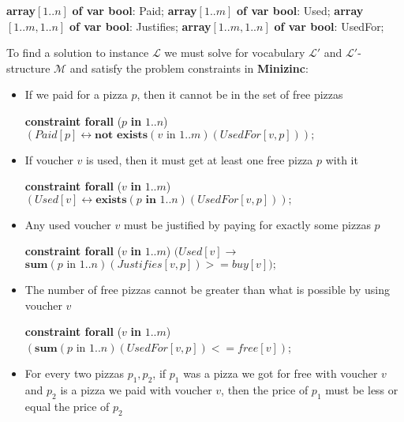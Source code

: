\documentclass[conference]{IEEEtran}
\newcommand\tab[1][0.3cm]{\hspace*{#1}}
\begin{document}
\begin{algorithmic}
\State \textbf{array}$[1..n]$ \textbf{of var bool}: Paid;
\State \textbf{array}$[1..m]$ \textbf{of var bool}: Used;
\State \textbf{array}$[1..m, 1..n]$ \textbf{of var bool}: Justifies;
\State \textbf{array}$[1..m, 1..n]$ \textbf{of var bool}: UsedFor;
\\
\end{algorithmic}
\tab To find a solution to instance $\mathcal{L}$ we must solve for vocabulary $\mathcal{L'}$ and $\mathcal{L'}$-structure $\mathcal{M}$ and satisfy the problem constraints in \textbf{Minizinc}:
\begin{itemize}
\item If we paid for a pizza $p$, then it cannot be in the set of free pizzas
\begin{algorithmic}
\State \textbf{constraint forall} ($p$ \textbf{in} $1..n$)
\State \tab\tab $(Paid[p]\leftrightarrow
           \textbf{not exists}(v \text{ in } 1..m)(UsedFor[v, p]));$
\\
\end{algorithmic}
\item If voucher $v$ is used, then it must get at least one free pizza $p$ with it
\begin{algorithmic}
\State \textbf{constraint forall} ($v$ \textbf{in} $1..m$)
\State \tab\tab $(Used[v]\leftrightarrow
           \textbf{exists}(p \textbf{ in } 1..n)(UsedFor[v, p]));$
\\
\end{algorithmic}
\item Any used voucher $v$ must be justified by paying for exactly some pizzas $p$
\begin{algorithmic}
\State \textbf{constraint forall} ($v$ \textbf{in} $1..m$)
\State \tab\tab $(Used[v]\rightarrow$
\State \tab\tab\tab $\textbf{sum}(p \text{ in } 1..n)(Justifies[v, p]) >= buy[v]);$
\\
\end{algorithmic}
\item The number of free pizzas cannot be greater than what is possible by using voucher $v$
\begin{algorithmic}
\State \textbf{constraint forall} ($v$ \textbf{in} $1..m$)
\State \tab\tab $(\textbf{sum}(p \text{ in } 1..n)(UsedFor[v, p]) <= free[v])$;
\\
\end{algorithmic}
\item For every two pizzas $p_1, p_2$, if $p_1$ was a pizza we got for free with voucher $v$ and $p_2$ is a pizza we paid with voucher $v$, then the price of $p_1$ must be less or equal the price of $p_2$

\end{itemize}
\end{document}
